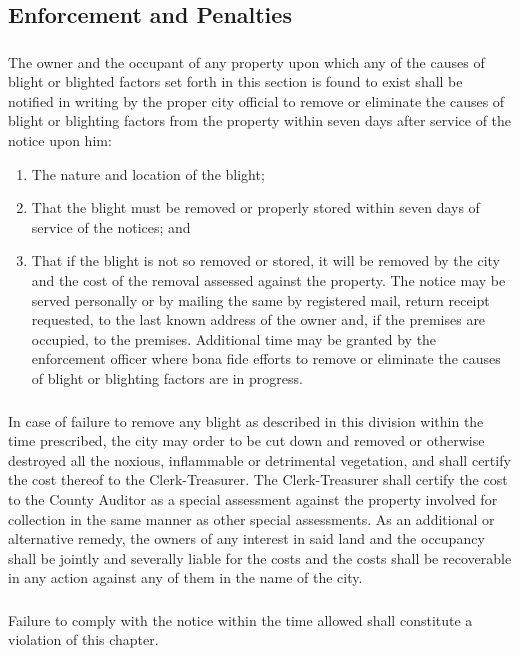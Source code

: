 \subsection{Enforcement and Penalties}
\subsubsection{}
The owner and the occupant of any property upon which any of the causes of blight or blighted factors set forth in this section is found to exist shall be notified in writing by the proper city official to remove or eliminate the causes of blight or blighting factors from the property within seven days after service of the notice upon him:
\begin{enumerate}[{\indent}a)]
    \item The nature and location of the blight; 
    \item That the blight must be removed or properly stored within seven days of service of the notices; and 
    \item That if the blight is not so removed or stored, it will be removed by the city and the cost of the removal assessed against the property. The notice may be served personally or by mailing the same by registered mail, return receipt requested, to the last known address of the owner and, if the premises are occupied, to the premises. Additional time may be granted by the enforcement officer where bona fide efforts to remove or eliminate the causes of blight or blighting factors are in progress.
\end{enumerate}
\subsubsection{}
In case of failure to remove any blight as described in this division within the time prescribed, the city may order to be cut down and removed or otherwise destroyed all the noxious, inflammable or detrimental vegetation, and shall certify the cost thereof to the Clerk-Treasurer. The Clerk-Treasurer shall certify the cost to the County Auditor as a special assessment against the property involved for collection in the same manner as other special assessments. As an additional or alternative remedy, the owners of any interest in said land and the occupancy shall be jointly and severally liable for the costs and the costs shall be recoverable in any action against any of them in the name of the city.
\subsubsection{}
Failure to comply with the notice within the time allowed shall constitute a violation of this chapter.

